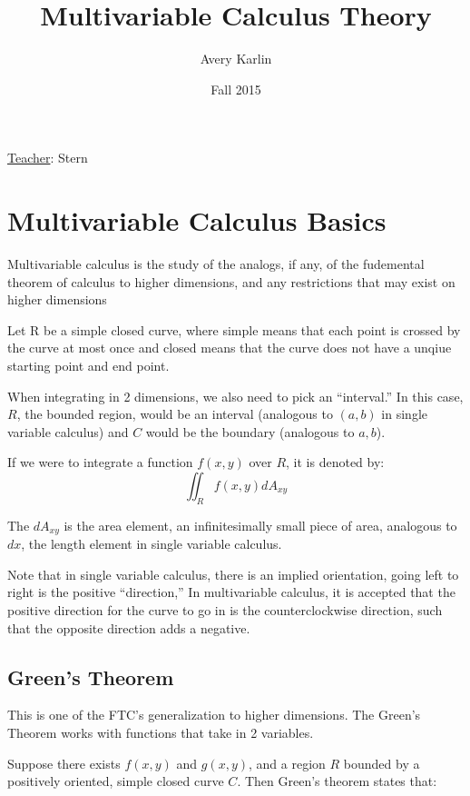 \documentclass[11 pt, twoside]{article}
\begin{document}
\title{Multivariable Calculus Theory}
\author{Avery Karlin}
\date{Fall 2015}

\maketitle
\newpage
\hypertarget{content}{\tableofcontents}
\vspace{11pt}
\noindent
\underline{Teacher}: Stern
\newpage

\section{Multivariable Calculus Basics}

Multivariable calculus is the study of the analogs, if any, of the fudemental theorem of calculus to higher dimensions, and any restrictions that may exist on higher dimensions

Let R be a simple closed curve, where simple means that each point is crossed by the curve at most once and closed means that the curve does not have a unqiue starting point and
end point.

When integrating in 2 dimensions, we also need to pick an ``interval.'' In this
case, $R$, the bounded region, would be an interval (analogous to $(a,b)$ in
single variable calculus) and $C$ would be the boundary (analogous to $a, b$).

If we were to integrate a function $f(x,y)$ over $R$, it is denoted by:
$$\iint_R f(x,y) dA_{xy}$$

The $dA_{xy}$ is the area element, an infinitesimally small piece of area,  analogous to $dx$, the length element in single variable calculus.

Note that in single variable calculus, there is an implied orientation, going
left to right is the positive ``direction,'' In multivariable calculus, it is
accepted that the positive direction for the curve to go in is the counterclockwise direction, such that the opposite direction adds a negative.

\subsection{Green's Theorem}

This is one of the FTC's generalization to higher dimensions. The Green's
Theorem works with functions that take in 2 variables.

Suppose there exists $f(x, y)$ and $g(x, y)$, and a region $R$ bounded by a
positively oriented, simple closed curve $C$. Then Green's theorem states that:
\end{document}
